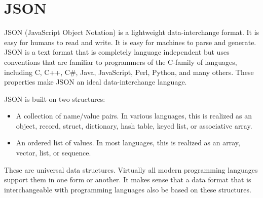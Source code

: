 \section{JSON}

JSON (JavaScript Object Notation) is a lightweight data-interchange format. It is easy for humans to read and write. It is easy for machines to parse and generate. JSON is a text format that is completely language independent but uses conventions that are familiar to programmers of the C-family of languages, including C, C++, C\#, Java, JavaScript, Perl, Python, and many others. These properties make JSON an ideal data-interchange language.

JSON is built on two structures:

\begin{itemize}
	\item A collection of name/value pairs. In various languages, this is realized as an object, record, struct, dictionary, hash table, keyed list, or associative array.
	\item An ordered list of values. In most languages, this is realized as an array, vector, list, or sequence.
\end{itemize}

These are universal data structures. Virtually all modern programming languages support them in one form or another. It makes sense that a data format that is interchangeable with programming languages also be based on these structures.
